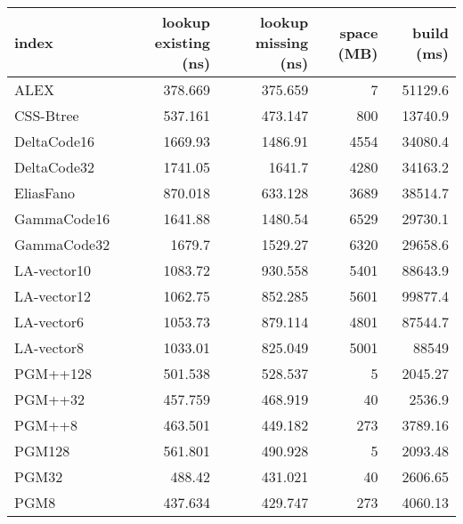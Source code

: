 \begin{tabular}{lrrrr}
\hline
 index             &   lookup existing (ns) &   lookup missing (ns) &   space (MB) &      build (ms) \\
\hline
 ALEX              &                378.669 &               375.659 &            7 &  51129.6        \\
 CSS-Btree         &                537.161 &               473.147 &          800 &  13740.9        \\
 DeltaCode16       &               1669.93  &              1486.91  &         4554 &  34080.4        \\
 DeltaCode32       &               1741.05  &              1641.7   &         4280 &  34163.2        \\
 EliasFano         &                870.018 &               633.128 &         3689 &  38514.7        \\
 GammaCode16       &               1641.88  &              1480.54  &         6529 &  29730.1        \\
 GammaCode32       &               1679.7   &              1529.27  &         6320 &  29658.6        \\
 LA-vector10       &               1083.72  &               930.558 &         5401 &  88643.9        \\
 LA-vector12       &               1062.75  &               852.285 &         5601 &  99877.4        \\
 LA-vector6        &               1053.73  &               879.114 &         4801 &  87544.7        \\
 LA-vector8        &               1033.01  &               825.049 &         5001 &  88549          \\
 PGM++128          &                501.538 &               528.537 &            5 &   2045.27       \\
 PGM++32           &                457.759 &               468.919 &           40 &   2536.9        \\
 PGM++8            &                463.501 &               449.182 &          273 &   3789.16       \\
 PGM128            &                561.801 &               490.928 &            5 &   2093.48       \\
 PGM32             &                488.42  &               431.021 &           40 &   2606.65       \\
 PGM8              &                437.634 &               429.747 &          273 &   4060.13       \\

\end{tabular}
